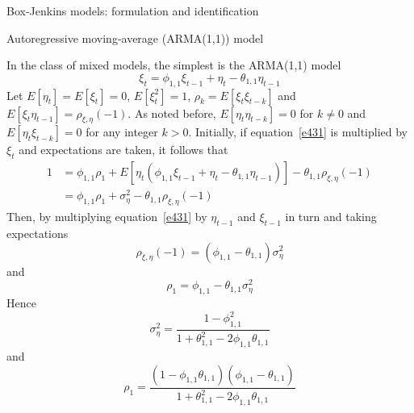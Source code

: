 \documentclass[8pt]{beamer}
\renewcommand{\emph}[1]{\textcolor{myorange}{#1}}
\begin{document}
\begin{frame}{Box-Jenkins models: formulation and identification}
    \begin{block}{Autoregressive moving-average (ARMA(1,1)) model}
    \end{block}
    In the class of \emph{mixed models}, the simplest is the \emph{ARMA(1,1)} model 
    \begin{equation}
        \xi_t  = \phi_{1,1}\xi_{t-1} + \eta_t - \theta_{1,1} \eta_{t-1}
        \label{e431}
    \end{equation}
    Let $E[\eta_t] = E[\xi_t] = 0$, $E[\xi_t^2] = 1$, $\rho_k = E[\xi_t \xi_{t-k}]$ and $E[\xi_t \eta_{t-1}] = \rho_{\xi, \eta} (-1)$. As noted before, $E[\eta_t \eta_{t-k}]=0$ for $k \neq 0$ and $E[\eta_t  \xi_{t-k}]=0$ for any integer $k>0$. Initially, if equation~\ref{e431} is multiplied by $\xi_t$ and expectations are taken, it follows that
    \begin{equation}
        \begin{aligned}
            1 &= \phi_{1,1}\rho_1 + E[\eta_t(\phi_{1,1} \xi_{t-1} + \eta_t - \theta_{1,1} \eta_{t-1})] - \theta_{1,1} \rho_{\xi, \eta} (-1) \\
              &= \phi_{1,1} \rho_1 + \sigma_{\eta}^2 - \theta_{1,1} \rho_{\xi, \eta} (-1)
        \end{aligned}
        \label{e432}
    \end{equation}
    Then, by multiplying equation~\ref{e431} by $\eta_{t-1}$ and $\xi_{t-1}$ in turn and taking expectations
    \begin{equation}
        \rho_{\xi, \eta} (-1) = (\phi_{1,1} - \theta_{1,1}) \sigma_{\eta}^2
        \label{e433}
    \end{equation}
    and
    \begin{equation}
        \rho_{1} = \phi_{1,1} - \theta_{1,1} \sigma_{\eta}^2
        \label{e434}
    \end{equation}
    Hence 
    \begin{equation}
        \sigma_{\eta}^2 =  \frac{1-\phi_{1,1}^2}{1+\theta_{1,1}^2 - 2\phi_{1,1} \theta_{1,1}}
        \label{e435}
    \end{equation}
    and
    \begin{equation}
        \rho_{1} = \frac{(1-\phi_{1,1}\theta_{1,1})(\phi_{1,1}- \theta_{1,1})}{1+\theta_{1,1}^2 - 2\phi_{1,1}\theta_{1,1}}
        \label{e436}
    \end{equation}

\end{frame}
\end{document}
